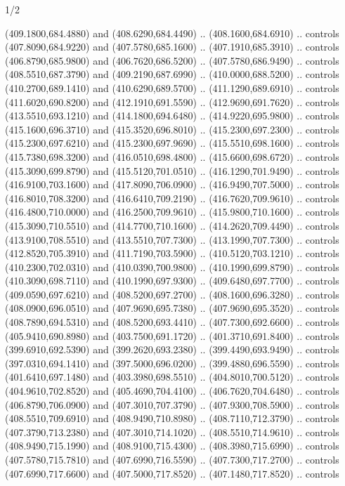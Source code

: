 \begin{flagdescription}{1/2}
\begin{scope}[xshift=0.5\flaglength]
\begin{scope}[scale=0.00745\flagwidth,xshift=-12.1mm,yshift=41.7mm]
\begin{scope}[y=0.80pt, x=0.80pt, yscale=-1, xscale=1, inner sep=0pt, outer sep=0pt]
\begin{scope}[cm={{1.33333,0.0,0.0,-1.33333,(0.0,114.66667)}}]
\begin{scope}[scale=0.100]
  (409.1800,684.4880) and (408.6290,684.4490) .. (408.1600,684.6910) .. controls
  (407.8090,684.9220) and (407.5780,685.1600) .. (407.1910,685.3910) .. controls
  (406.8790,685.9800) and (406.7620,686.5200) .. (407.5780,686.9490) .. controls
  (408.5510,687.3790) and (409.2190,687.6990) .. (410.0000,688.5200) .. controls
  (410.2700,689.1410) and (410.6290,689.5700) .. (411.1290,689.6910) .. controls
  (411.6020,690.8200) and (412.1910,691.5590) .. (412.9690,691.7620) .. controls
  (413.5510,693.1210) and (414.1800,694.6480) .. (414.9220,695.9800) .. controls
  (415.1600,696.3710) and (415.3520,696.8010) .. (415.2300,697.2300) .. controls
  (415.2300,697.6210) and (415.2300,697.9690) .. (415.5510,698.1600) .. controls
  (415.7380,698.3200) and (416.0510,698.4800) .. (415.6600,698.6720) .. controls
  (415.3090,699.8790) and (415.5120,701.0510) .. (416.1290,701.9490) .. controls
  (416.9100,703.1600) and (417.8090,706.0900) .. (416.9490,707.5000) .. controls
  (416.8010,708.3200) and (416.6410,709.2190) .. (416.7620,709.9610) .. controls
  (416.4800,710.0000) and (416.2500,709.9610) .. (415.9800,710.1600) .. controls
  (415.3090,710.5510) and (414.7700,710.1600) .. (414.2620,709.4490) .. controls
  (413.9100,708.5510) and (413.5510,707.7300) .. (413.1990,707.7300) .. controls
  (412.8520,705.3910) and (411.7190,703.5900) .. (410.5120,703.1210) .. controls
  (410.2300,702.0310) and (410.0390,700.9800) .. (410.1990,699.8790) .. controls
  (410.3090,698.7110) and (410.1990,697.9300) .. (409.6480,697.7700) .. controls
  (409.0590,697.6210) and (408.5200,697.2700) .. (408.1600,696.3280) .. controls
  (408.0900,696.0510) and (407.9690,695.7380) .. (407.9690,695.3520) .. controls
  (408.7890,694.5310) and (408.5200,693.4410) .. (407.7300,692.6600) .. controls
  (405.9410,690.8980) and (403.7500,691.1720) .. (401.3710,691.8400) .. controls
  (399.6910,692.5390) and (399.2620,693.2380) .. (399.4490,693.9490) .. controls
  (397.0310,694.1410) and (397.5000,696.0200) .. (399.4880,696.5590) .. controls
  (401.6410,697.1480) and (403.3980,698.5510) .. (404.8010,700.5120) .. controls
  (404.9610,702.8520) and (405.4690,704.4100) .. (406.7620,704.6480) .. controls
  (406.8790,706.0900) and (407.3010,707.3790) .. (407.9300,708.5900) .. controls
  (408.5510,709.6910) and (408.9490,710.8980) .. (408.7110,712.3790) .. controls
  (407.3790,713.2380) and (407.3010,714.1020) .. (408.5510,714.9610) .. controls
  (408.9490,715.1990) and (408.9100,715.4300) .. (408.3980,715.6990) .. controls
  (407.5780,715.7810) and (407.6990,716.5590) .. (407.7300,717.2700) .. controls
  (407.6990,717.6600) and (407.5000,717.8520) .. (407.1480,717.8520) .. controls

\end{scope}
\end{scope}
\end{scope}
\end{scope}
\end{scope}
\end{flagdescription}
